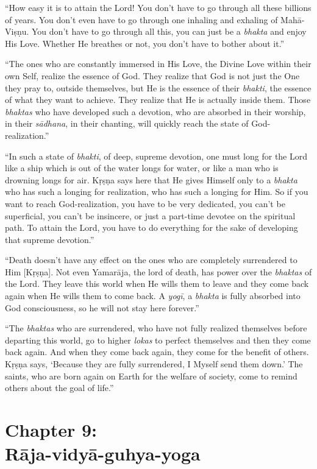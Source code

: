 \documentclass[12pt, twoside, openright]{memoir}
\begin{document}
\enquote{How easy it is to attain the Lord! You don’t have to go through all these billions of years. You don’t even have to go through one inhaling and exhaling of Mahā-Viṣṇu. You don’t have to go through all this, you can just be a \textit{bhakta} and enjoy His Love. Whether He breathes or not, you don’t have to bother about it.}

\enquote{The ones who are constantly immersed in His Love, the Divine Love within their own Self, realize the essence of God. They realize that God is not just the One they pray to, outside themselves, but He is the essence of their \textit{bhakti}, the essence of what they want to achieve. They realize that He is actually inside them. Those \textit{bhaktas} who have developed such a devotion, who are absorbed in their worship, in their \textit{sādhana}, in their chanting, will quickly reach the state of God-realization.}

\enquote{In such a state of \textit{bhakti}, of deep, supreme devotion, one must long for the Lord like a ship which is out of the water longs for water, or like a man who is drowning longs for air. Kṛṣṇa says here that He gives Himself only to a \textit{bhakta} who has such a longing for realization, who has such a longing for Him. So if you want to reach God-realization, you have to be very dedicated, you can’t be superficial, you can’t be insincere, or just a part-time devotee on the spiritual path. To attain the Lord, you have to do everything for the sake of developing that supreme devotion.}

\enquote{Death doesn’t have any effect on the ones who are completely surrendered to Him [Kṛṣṇa]. Not even Yamarāja, the lord of death, has power over the \textit{bhaktas} of the Lord. They leave this world when He wills them to leave and they come back again when He wills them to come back. A \textit{yogī}, a \textit{bhakta} is fully absorbed into God consciousness, so he will not stay here forever.}

\enquote{The \textit{bhaktas} who are surrendered, who have not fully realized themselves before departing this world, go to higher \textit{lokas} to perfect themselves and then they come back again. And when they come back again, they come for the benefit of others. Kṛṣṇa says, \enquote{Because they are fully surrendered, I Myself send them down.} The saints, who are born again on Earth for the welfare of society, come to remind others about the goal of life.}
 \chapter{Chapter 9: \\Rāja-vidyā-guhya-yoga}\label{chap-raja-vidya-guhya-yoga}
\end{document}
